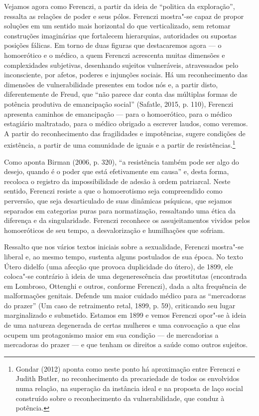 Vejamos agora como Ferenczi, a partir da ideia de ``politica da
exploração'', ressalta as relações de poder e seus pólos. Ferenczi
mostra"-se capaz de propor soluções em um sentido mais horizontal do que
verticalizado, sem retomar construções imaginárias que fortalecem
hierarquias, autoridades ou supostas posições fálicas. Em torno de duas
figuras que destacaremos agora --- o homoerótico e o médico, a quem
Ferenczi acrescenta muitas dimensões e complexidades subjetivas,
desenhando sujeitos vulneráveis, atravessados pelo inconsciente, por
afetos, poderes e injunções sociais. Há um reconhecimento das dimensões
de vulnerabilidade presentes em todos nós e, a partir disto,
diferentemente de Freud, que ``não parece dar conta das múltiplas formas
de potência produtiva de emancipação social'' (Safatle, 2015, p. 110),
Ferenczi apresenta caminhos de emancipação --- para o homoerótico, para o
médico estagiário maltratado, para o médico obrigado a escrever laudos,
como veremos. A partir do reconhecimento das fragilidades e impotências,
sugere condições de existência, a partir de uma comunidade de iguais e a
partir de resistências.\footnote{Gondar (2012) aponta como neste ponto há
  aproximação entre Ferenczi e Judith Butler, no reconhecimento da
  precariedade de todos os envolvidos numa relação, na superação da
  instância ideal e na proposta de laço social construído sobre o
  reconhecimento da vulnerabilidade, que conduz à potência.}

Como aponta Birman (2006, p. 320), ``a resistência também pode ser algo
do desejo, quando é o poder que está efetivamente em causa'' e, desta
forma, recoloca o registro da impossibilidade de adesão à ordem
patriarcal. Neste sentido, Ferenczi resiste a que o homoerotismo seja
compreendido como perversão, que seja desarticulado de suas dinâmicas
psíquicas, que sejamos separados em categorias puras para normatização,
ressaltando uma ética da diferença e da singularidade. Ferenczi
reconhece os assujeitamentos vividos pelos homoeróticos de seu tempo, a
desvalorização e humilhações que sofriam.

Ressalto que nos vários textos iniciais sobre a sexualidade, Ferenczi
mostra"-se liberal e, ao mesmo tempo, sustenta alguns postulados de sua
época. No texto Útero didelfo (uma afecção que provoca duplicidade do
útero), de 1899, ele coloca"-se contrário à ideia de uma degenerescência
das prostitutas (encontrada em Lombroso, Ottenghi e outros, conforme
Ferenczi), dada a alta frequência de malformações genitais. Defende um
maior cuidado médico para as ``mercadoras do prazer'' (Um caso de
retraimento retal, 1899, p. 59), criticando seu lugar marginalizado e
submetido. Estamos em 1899 e vemos Ferenczi opor"-se à ideia de uma
natureza degenerada de certas mulheres e uma convocação a que elas
ocupem um protagonismo maior em sua condição --- de mercadorias a
mercadoras do prazer --- e que tenham os direitos a saúde como outros
sujeitos.

